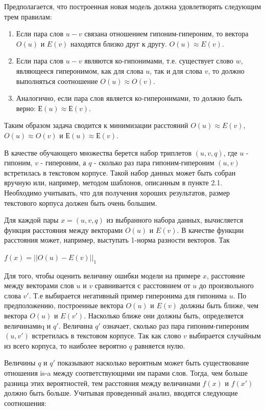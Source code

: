 Предполагается, что построенная новая модель должна удовлетворять следующим
трем правилам:

\begin{enumerate}
\item Если пара слов $u-v$ связана отношением гипоним-гипероним, то вектора $O(u)$ и $E(v)$ находятся близко друг к другу. $O(u) \approx E(v)$.

\item Если пара слов $u-v$ являются ко-гипонимами, т.е. существует слово $w$,
являющееся гиперонимом, как для слова $u$, так и для слова $v$, то должно
выполняться соотношение $O(u) \approx O(v)$.

\item Аналогично, если пара слов является ко-гиперонимами, то должно быть верно: $Е(u) \approx Е(v)$.
\end{enumerate}

Таким образом задача сводится к минимизации расстояний $O(u) \approx E(v)$, $O(u) \approx O(v)$ и $Е(u) \approx Е(v)$.

В качестве обучающего множества берется набор триплетов $(u, v, q)$, где $u$ - гипоним, $v$ - гипероним, а $q$ - сколько раз пара гипоним-гипероним $(u, v)$ встретилась в текстовом корпусе. Такой набор данных может быть собран вручную или,
например, методом шаблонов, описанным в пункте 2.1. Необходимо учитывать, что
для получения хороших результатов, размер текстового корпуса должен быть
очень большим.

Для каждой пары $x = (u, v, q)$ из выбранного набора данных, вычисляется функция
расстояния между векторами $O(u)$ и $E(v)$. В качестве функции расстояния может,
например, выступать 1-норма разности векторов. Так

$f(x) = ||O(u) - E(v)||_1$

Для того, чтобы оценить величину ошибки модели на примере $x$, расстояние между
векторами слов $u$ и $v$ сравнивается с расстоянием от $u$ до произвольного слова $v'$.
Т.е выбирается негативный пример гиперонима для гипонима $u$. По
предположению, построенные вектора $O(u)$ и $E(v)$ должны быть ближе, чем
вектора $O(u)$ и $E(v')$. Насколько ближе они должны быть, определяется величинамиq и $q'$. Величина $q'$ означает, сколько раз пара гипоним-гипероним $(u, v')$
встретилась в текстовом корпусе. Так как слово $v$ выбирается случайным из всего
корпуса, то наиболее вероятно $q$ равняется нулю.

Величины $q$ и $q'$ показывают насколько вероятным может быть существование
отношения is-a между соответствующими им парами слов. Тогда, чем больше
разница этих вероятностей, тем расстояния между величинами $f(x)$ и $f(x')$ должно
быть больше. Учитывая проведенный анализ, вводятся следующие соотношения:

